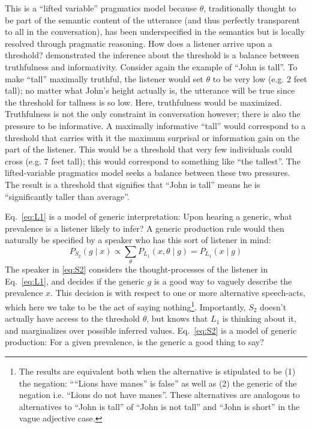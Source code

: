 \documentclass[10pt,letterpaper]{article}
\begin{document}
This is a ``lifted variable'' pragmatics model because $\theta$, traditionally thought to be part of the semantic content of the utterance (and thus perfectly transparent to all in the conversation), has been underspecified in the semantics but is locally resolved through pragmatic reasoning.
How does a listener arrive upon a threshold? 
 demonstrated the inference about the threshold is a balance between truthfulness and informativity. 
Consider again the example of ``John is tall''. 
To make ``tall'' maximally truthful, the listener would set $\theta$ to be very low (e.g. 2 feet tall); no matter what John's height actually is, the utterance will be true since the threshold for tallness is so low. Here, truthfulness would be maximized. 
 Truthfulness is not the only constraint in conversation however; there is also the pressure to be informative. 
 A maximally informative ``tall'' would correspond to a threshold that carries with it the maximum surprisal or information gain on the part of the listener. 
 This would be a threshold that very few individuals could cross (e.g. 7 feet tall); this would correspond to something like ``the tallest''. 
 The lifted-variable pragmatics model seeks a balance between these two pressures. 
 The result is a threshold that signifies that ``John is tall'' means he is ``significantly taller than average''.
 
Eq.~\ref{eq:L1} is a model of generic interpretation: Upon hearing a generic, what prevalence is a listener likely to infer?
A generic production rule would then naturally be specified by a speaker who has this sort of listener in mind:
\begin{equation} 
P_{S_{2}}(g \mid x) \propto  \sum_{\theta} P_{L_{1}}(x , \theta \mid g) =  P_{L_{1}}(x \mid g)
\label{eq:S2}
\end{equation}
%
The speaker in \eqref{eq:S2} considers the thought-processes of the listener in Eq.~\eqref{eq:L1}, and decides if the generic $g$ is a good way to vaguely describe the prevalence $x$. 
This decision is with respect to one or more alternative speech-acts, which here we take to be the act of saying nothing\footnote{The results are equivalent both when the alternative is stipulated to be (1) the negation:  ````Lions have manes'' is false'' as well as (2) the generic of the negation i.e. ``Lions do not have manes''. These alternatives are analogous to alternatives to ``John is tall'' of ``John is not tall'' and ``John is short'' in the vague adjective case.}. 
Importantly, $S_{2}$ doesn't actually have access to the threshold $\theta$, but knows that $L_{1}$ is thinking about it, and marginalizes over possible inferred values. 
Eq.~\eqref{eq:S2} is a model of generic production: For a given prevalence, is the generic a good thing to say?
\end{document}
